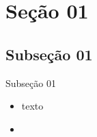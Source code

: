 

\section{Seção 01}

\subsection[]{Subseção 01}

\begin{frame}{Subseção 01}
	\begin{itemize}[<+->]
		\item texto
		\item 
	\end{itemize}
\end{frame}


